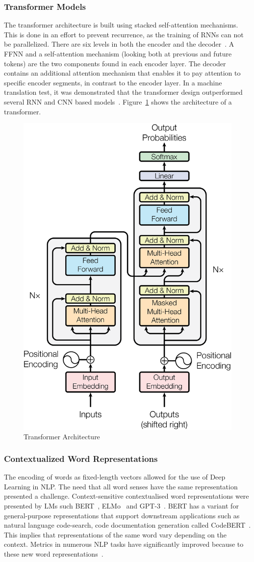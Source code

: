 \subsubsection{Transformer Models}
The transformer architecture is built using stacked self-attention mechanisms. This is done in an effort to prevent recurrence, as the training of RNNs can not be parallelized. There are six levels in both the encoder and the decoder~\cite{attention}. A FFNN and a self-attention mechanism (looking both at previous and future tokens) are the two components found in each encoder layer. The decoder contains an additional attention mechanism that enables it to pay attention to specific encoder segments, in contrast to the encoder layer. 
In a machine translation test, it was demonstrated that the transformer design outperformed several RNN and CNN based models~\cite{attention}. Figure~\ref{fig:transformer} shows the architecture of a transformer.

\begin{figure}[hbt!]
    \centering
    \includegraphics[width=.4\linewidth]{Figures/transformer.png}
    \caption{Transformer Architecture~\cite{attention}}
    \label{fig:transformer}
\end{figure}

\subsubsection{Contextualized Word Representations}
The encoding of words as fixed-length vectors allowed for the use of Deep Learning in NLP. The need that all word senses have the same representation presented a challenge. Context-sensitive contextualised word representations were presented by LMs such BERT~\cite{bert}, ELMo~\cite{elmo} and GPT-3~\cite{Gpt3}. BERT has a variant for general-purpose representations that support downstream applications such as natural language code-search, code documentation generation called CodeBERT~\cite{codebert}. This implies that representations of the same word vary depending on the context. Metrics in numerous NLP tasks have significantly improved because to these new word representations~\cite{contextual}. 